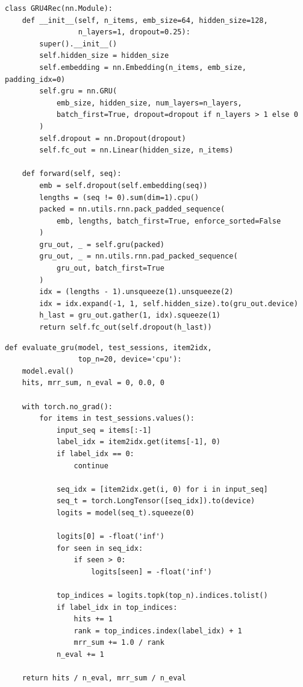 \documentclass[12pt, a4paper]{article}
\begin{document}
\begin{lstlisting}[caption={Trích đoạn forward của GRU4Rec (src/models/gru4rec.py)}, label={lst:gru4rec_core}]
class GRU4Rec(nn.Module):
    def __init__(self, n_items, emb_size=64, hidden_size=128,
                 n_layers=1, dropout=0.25):
        super().__init__()
        self.hidden_size = hidden_size
        self.embedding = nn.Embedding(n_items, emb_size, padding_idx=0)
        self.gru = nn.GRU(
            emb_size, hidden_size, num_layers=n_layers,
            batch_first=True, dropout=dropout if n_layers > 1 else 0
        )
        self.dropout = nn.Dropout(dropout)
        self.fc_out = nn.Linear(hidden_size, n_items)

    def forward(self, seq):
        emb = self.dropout(self.embedding(seq))
        lengths = (seq != 0).sum(dim=1).cpu()
        packed = nn.utils.rnn.pack_padded_sequence(
            emb, lengths, batch_first=True, enforce_sorted=False
        )
        gru_out, _ = self.gru(packed)
        gru_out, _ = nn.utils.rnn.pad_packed_sequence(
            gru_out, batch_first=True
        )
        idx = (lengths - 1).unsqueeze(1).unsqueeze(2)
        idx = idx.expand(-1, 1, self.hidden_size).to(gru_out.device)
        h_last = gru_out.gather(1, idx).squeeze(1)
        return self.fc_out(self.dropout(h_last))
\end{lstlisting}

\begin{lstlisting}[caption={Trích đoạn đánh giá leave-one-out}, label={lst:evaluate_core}]
def evaluate_gru(model, test_sessions, item2idx,
                 top_n=20, device='cpu'):
    model.eval()
    hits, mrr_sum, n_eval = 0, 0.0, 0

    with torch.no_grad():
        for items in test_sessions.values():
            input_seq = items[:-1]
            label_idx = item2idx.get(items[-1], 0)
            if label_idx == 0:
                continue

            seq_idx = [item2idx.get(i, 0) for i in input_seq]
            seq_t = torch.LongTensor([seq_idx]).to(device)
            logits = model(seq_t).squeeze(0)

            logits[0] = -float('inf')
            for seen in seq_idx:
                if seen > 0:
                    logits[seen] = -float('inf')

            top_indices = logits.topk(top_n).indices.tolist()
            if label_idx in top_indices:
                hits += 1
                rank = top_indices.index(label_idx) + 1
                mrr_sum += 1.0 / rank
            n_eval += 1

    return hits / n_eval, mrr_sum / n_eval
\end{lstlisting}

\end{document}

